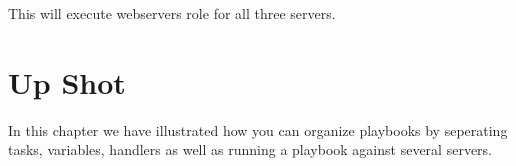 \documentclass[10pt]{book}
\begin{document}
This will execute webservers role for all three servers.

\section{Up Shot}
In this chapter we have illustrated how you can organize playbooks by seperating tasks, variables, handlers 
as well as running a playbook against several servers.













 

 
 

\printindex

\clearemptydoublepage
\end{document}
